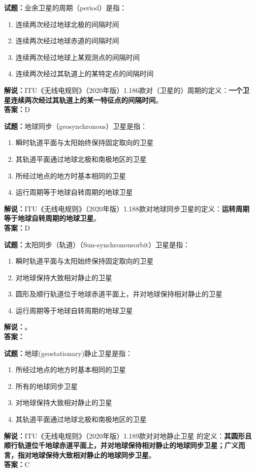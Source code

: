 \documentclass{ctexbook}
\begin{document}
\noindent\textbf{试题：}业余卫星的周期（period）是指：
\begin{enumerate}[leftmargin=3em]
\item 连续两次经过地球北极的间隔时间
\item 连续两次经过地球赤道的间隔时间
\item 连续两次经过地球上某观测点的间隔时间
\item 连续两次经过其轨道上的某特定点的间隔时间
\end{enumerate}
\noindent\textbf{解说：}ITU《无线电规则》（2020年版）1.186款对（卫星的）周期的定义：\textbf{一个卫星连续两次经过其轨道上的某一特征点的间隔时间}。\\\noindent\textbf{答案：}D


\bigskip




\noindent\textbf{试题：}地球同步（geosynchronous）卫星是指：
\begin{enumerate}[leftmargin=3em]
\item 瞬时轨道平面与太阳始终保持固定取向的卫星
\item 其轨道平面通过地球北极和南极地区的卫星
\item 所经过地点的地方时基本相同的卫星
\item 运行周期等于地球自转周期的地球卫星
\end{enumerate}
\noindent\textbf{解说：}ITU《无线电规则》（2020年版）1.188款对地球同步卫星的定义：\textbf{运转周期等于地球自转周期的地球卫星}。\\\noindent\textbf{答案：}D

\bigskip




\noindent\textbf{试题：}太阳同步（轨道）（Sun-synchronousorbit）卫星是指：
\begin{enumerate}[leftmargin=3em]
\item 瞬时轨道平面与太阳始终保持固定取向的卫星
\item 对地球保持大致相对静止的卫星
\item 圆形及顺行轨道位于地球赤道平面上，并对地球保持相对静止的卫星
\item 运行周期等于地球自转周期的地球卫星
\end{enumerate}
\noindent\textbf{解说：}\textbf{}。\\\noindent\textbf{答案：}


\bigskip




\noindent\textbf{试题：}地球(geostationary)静止卫星是指：
\begin{enumerate}[leftmargin=3em]
\item 所经过地点的地方时基本相同的卫星
\item 所有的地球同步卫星
\item 对地球保持大致相对静止的卫星
\item 其轨道平面通过地球北极和南极地区的卫星
\end{enumerate}
\noindent\textbf{解说：}ITU《无线电规则》（2020年版）1.189款对对地静止卫星
的定义：\textbf{其圆形且顺行轨道位千地球赤道平面上，并对地球保待相对静止的地球同步卫星；广义而言，指对地球保待大致相对静止的地球同步卫星}。\\\noindent\textbf{答案：}C
\end{document}
